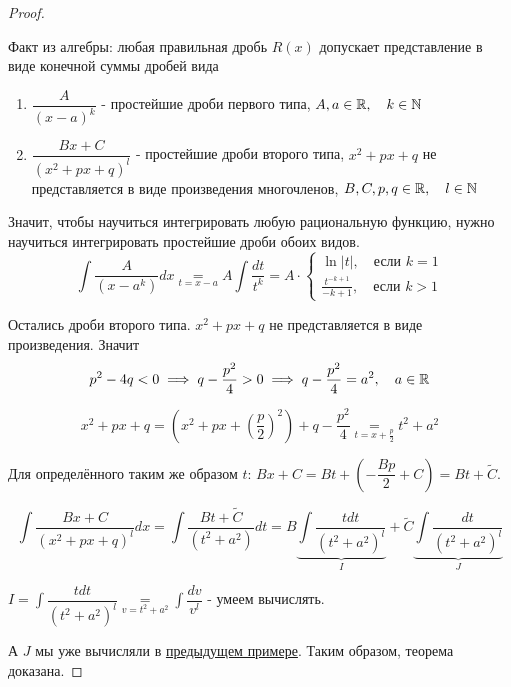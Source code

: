 \documentclass[../main.tex]{subfiles}
\begin{document}
\begin{proof}
    
    ~

    Факт из алгебры: любая правильная дробь \( R\left( x\right) \) допускает представление в виде конечной суммы дробей вида 
    \begin{enumerate}
        \item \( \dfrac{ A}{ \left( x-a\right)^k} \) - простейшие дроби первого типа, \( A,a \in \mathbb{R} ,\quad k \in \mathbb{N}\)
        \item \( \dfrac{ Bx+C}{ \left( x^2+px+q\right)^l} \) - простейшие дроби второго типа, \( x^2+px+q\) не представляется в виде произведения многочленов, \( B,C,p,q \in \mathbb{R} ,\quad l \in \mathbb{N}\)
    \end{enumerate}

    Значит, чтобы научиться интегрировать любую рациональную функцию, нужно научиться интегрировать простейшие дроби обоих видов. 
    \begin{equation*}
        \displaystyle\int\limits_{ }^{ } \dfrac{ A}{ \left( x-a^k\right)}dx \underset{t=x-a}{=}A \displaystyle\int\limits_{ }^{ } \dfrac{ dt}{ t^k} = A \cdot 
        \begin{cases}
            \ln \left| t\right|,\quad \text{если } k = 1\\ 
            \frac{ t^{-k+1}}{ -k+1} ,\quad \text{если } k > 1
        \end{cases} 
    \end{equation*}

    Остались дроби второго типа. \( x^2+px+q\) не представляется в виде произведения. Значит 
    \[ p^2-4q<0 \implies q- \dfrac{ p^2}{ 4} > 0 \implies q- \dfrac{ p^2}{ 4} =a^2,\quad a \in \mathbb{R} \]

    \[ x^2+px+q=\left( x^2+px+ \left( \dfrac{ p}{ 2} \right)^2\right)+q- \dfrac{ p^2}{ 4} \underset{t=x+ \frac{ p}{ 2} }{=} t^2+a^2\]

    Для определённого таким же образом \( t\): \( Bx+C=Bt+\left( - \dfrac{ Bp}{ 2} +C\right)=Bt + \tilde{ C}\).

    \[ \displaystyle\int\limits_{ }^{ } \dfrac{ Bx+C}{ \left( x^2+px+q\right)^l} dx= \displaystyle\int\limits_{ }^{ } \dfrac{ Bt+\tilde{C}}{ \left( t^2+a^2\right)} dt=B \underbrace{\displaystyle\int\limits_{ }^{ } \dfrac{ tdt}{ \left( t^2+a^2\right)^l}}_I + \tilde{ C} \underbrace{\displaystyle\int\limits_{ }^{ } \dfrac{ dt}{ \left( t^2+a^2\right)^l}}_{J} \]

    \( I = \displaystyle\int\limits_{ }^{ } \dfrac{ tdt}{ \left( t^2+a^2\right)^l} \underset{v=t^2+a^2}{=} \displaystyle\int\limits_{ }^{ } \dfrac{ dv}{ v^l}\) - умеем вычислять. 

    А \( J\) мы уже вычисляли в \hyperlink{ex:int_recur}{предыдущем примере}. Таким образом, теорема доказана. 
\end{proof}
\end{document}
